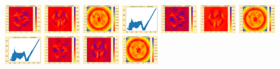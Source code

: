 \documentclass[11pt]{article}
\begin{document}
\includegraphics[width=0.11875\textwidth]{frame0043fig2.png}
\includegraphics[width=0.11875\textwidth]{frame0043fig3.png}
\vskip 10pt 
\includegraphics[width=0.11875\textwidth]{frame0044fig0.png}
\includegraphics[width=0.11875\textwidth]{frame0044fig1.png}
\includegraphics[width=0.11875\textwidth]{frame0044fig2.png}
\includegraphics[width=0.11875\textwidth]{frame0044fig3.png}
\includegraphics[width=0.11875\textwidth]{frame0045fig0.png}
\includegraphics[width=0.11875\textwidth]{frame0045fig1.png}
\includegraphics[width=0.11875\textwidth]{frame0045fig2.png}
\includegraphics[width=0.11875\textwidth]{frame0045fig3.png}
\vskip 10pt 
\includegraphics[width=0.11875\textwidth]{frame0046fig0.png}
\end{document}

